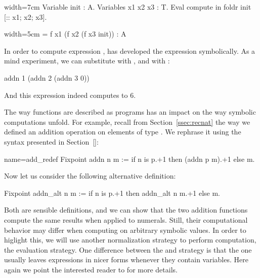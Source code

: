 \begin{coq}{}{width=7cm}
Variable init : A.
Variables x1 x2 x3 : T.
Eval compute in
  foldr init [:: x1; x2; x3].
\end{coq}
\begin{coqout}{}{width=5cm}
= f x1 (f x2 (f x3 init))
: A
\end{coqout}

In order to compute expression ,
\Coq{} has developed the expression symbolically.  As a mind
experiment, we can substitute  with , and
\C{[:: x1; x2; x3]} with \C{[:: 1; 2; 3]}:

\begin{coq}{}{}
addn 1 (addn 2 (addn 3 0))
\end{coq}

And this expression indeed computes to 6.


The way functions are described as programs has an impact on the way
symbolic computations unfold. For example, recall from
Section~\ref{ssec:recnat} the way we defined an addition operation on
elements of type . We rephrase it using the  syntax presented in Section~\ref{}:

\begin{coq}{name=add_redef}{}
Fixpoint addn n m := if n is p.+1 then (addn p m).+1 else m.
\end{coq}

Now let us consider the following alternative definition:

\begin{coq}{}{}
Fixpoint addn_alt n m := if n is p.+1 then addn_alt n m.+1 else m.
\end{coq}

Both are sensible definitions, and we can show that the two addition
functions compute the same results when applied to numerals.  Still,
their computational behavior may differ when computing on arbitrary
symbolic values. In order to higlight this, we will use another
normalization strategy to perform computation, the 
evaluation strategy.  One difference between the 
and  strategy is that the  one usually leaves
expressions in nicer forms whenever they contain variables. Here again
we point the interested reader to \cite[Section 8.7.1]{Coq:manual} for
more details.


